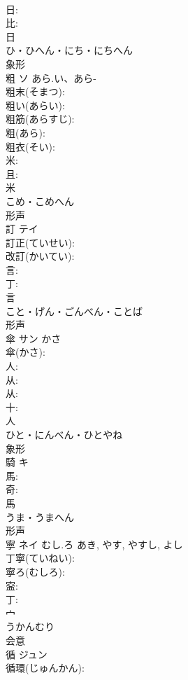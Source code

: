 \documentclass[8pt]{extreport}
\begin{document}
\begin{CJK}{UTF8}{min}
\\	日: 
\\	比: 
\\	日	
\\	ひ・ひへん・にち・にちへん	
\\	象形 
\\	粗	ソ	あら.い、あら-		
\\	粗末(そまつ): 
\\	粗い(あらい): 
\\	粗筋(あらすじ): 
\\	粗(あら): 
\\	粗衣(そい): 
\\	米: 
\\	且: 
\\	米	
\\	こめ・こめへん	
\\	形声 
\\	訂	テイ			
\\	訂正(ていせい): 
\\	改訂(かいてい): 
\\	言: 
\\	丁: 
\\	言	
\\	こと・げん・ごんべん・ことば	
\\	形声 
\\	傘	サン	かさ		
\\	傘(かさ): 
\\	人: 
\\	从: 
\\	从: 
\\	十: 
\\	人	
\\	ひと・にんべん・ひとやね	
\\	象形 
\\	騎	キ			
\\	馬: 
\\	奇: 
\\	馬	
\\	うま・うまへん	
\\	形声 
\\	寧	ネイ	むし.ろ	あき, やす, やすし, よし	
\\	丁寧(ていねい): 
\\	寧ろ(むしろ): 
\\	寍: 
\\	丁: 
\\	宀	
\\	うかんむり	
\\	会意 
\\	循	ジュン			
\\	循環(じゅんかん): 

\end{CJK}
\end{document}
